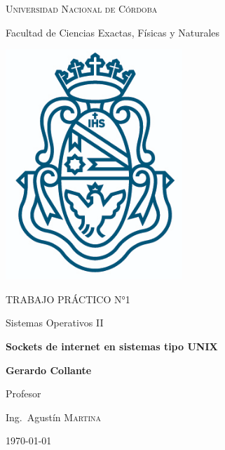 \documentclass[a4paper]{article}
\begin{document}
\begin{titlepage}
	
	{\scshape\LARGE Universidad Nacional de Córdoba \par}
	{\Large Facultad de Ciencias Exactas, Físicas y Naturales \par}
	\vspace{0.5cm}
	\centering
	\includegraphics[width=0.5\textwidth]{unc.png}
	\par\vspace{0.5cm}
	\vspace{0.5cm}
	{\scshape\Large TRABAJO PRÁCTICO N°1\par}
	{\large Sistemas Operativos II\par}
	\vspace{1.5cm}
	{\large\bfseries Sockets de internet en sistemas tipo UNIX \par}
	\vspace{1.5cm}
	{\Large\bfseries Gerardo Collante\par}
	\vfill
	Profesor\par
	Ing.~Agustín \textsc{Martina}

	\vfill

	{\large \today\par}
\end{titlepage}

\end{document}
